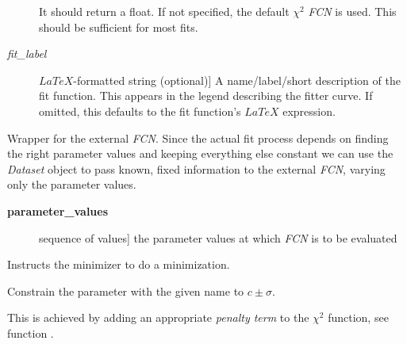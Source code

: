 \documentclass[a4paper,10pt,english]{sphinxmanual}
\begin{document}
\begin{fulllineitems}
\begin{description}
It should return a float. If not specified, the default $\chi^2$
\emph{FCN} is used. This should be sufficient for most fits.

\item[{\emph{fit\_label}}] \leavevmode{[}$LaTeX$-formatted string (optional){]}
A name/label/short description of the fit function. This appears in the
legend describing the fitter curve. If omitted, this defaults to the
fit function's $LaTeX$ expression.

\end{description}

\begin{fulllineitems}
\label{index:kafe.fit.Fit.call_external_fcn}
Wrapper for the external \emph{FCN}. Since the actual fit process depends on
finding the right parameter values and keeping everything else constant
we can use the \emph{Dataset} object to pass known, fixed information to the
external \emph{FCN}, varying only the parameter values.
\begin{description}
\item[{\textbf{parameter\_values}}] \leavevmode{[}sequence of values{]}
the parameter values at which \emph{FCN} is to be evaluated

\end{description}

\end{fulllineitems}


\begin{fulllineitems}
\label{index:kafe.fit.Fit.call_minimizer}
Instructs the minimizer to do a minimization.

\end{fulllineitems}


\begin{fulllineitems}
\label{index:kafe.fit.Fit.constrain_parameters}
Constrain the parameter with the given name to $c\pm\sigma$.

This is achieved by adding an appropriate \emph{penalty term} to the $\chi^2$
function, see function .
\begin{quote}


\end{quote}
\end{fulllineitems}
\end{fulllineitems}
\end{document}
